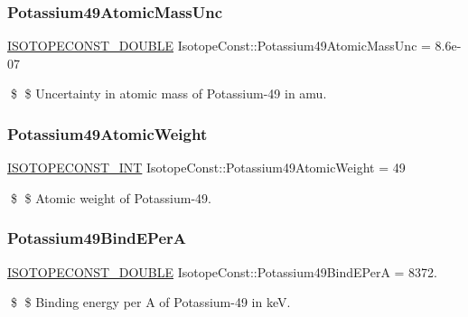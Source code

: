 \subsubsection{\texorpdfstring{Potassium49\+Atomic\+Mass\+Unc}{Potassium49AtomicMassUnc}}
{\footnotesize\ttfamily \mbox{\hyperlink{group___isotope_const-_macros_ga8f45a7272ce02c0b4c65c44636ed719a}{I\+S\+O\+T\+O\+P\+E\+C\+O\+N\+S\+T\+\_\+\+D\+O\+U\+B\+LE}} Isotope\+Const\+::\+Potassium49\+Atomic\+Mass\+Unc = 8.\+6e-\/07}

\$ \$ Uncertainty in atomic mass of Potassium-\/49 in amu. \mbox{\label{group___isotope_const-_potassium-_k49_ga827ba389a0e105abcfdfb1c98f5f6232}} 
\subsubsection{\texorpdfstring{Potassium49\+Atomic\+Weight}{Potassium49AtomicWeight}}
{\footnotesize\ttfamily \mbox{\hyperlink{group___isotope_const-_macros_ga5f18360b3e99483a35c32d789e62621c}{I\+S\+O\+T\+O\+P\+E\+C\+O\+N\+S\+T\+\_\+\+I\+NT}} Isotope\+Const\+::\+Potassium49\+Atomic\+Weight = 49}

\$ \$ Atomic weight of Potassium-\/49. \mbox{\label{group___isotope_const-_potassium-_k49_ga6f46d54396fc95dcbdb14816a830c299}} 
\subsubsection{\texorpdfstring{Potassium49\+Bind\+E\+PerA}{Potassium49BindEPerA}}
{\footnotesize\ttfamily \mbox{\hyperlink{group___isotope_const-_macros_ga8f45a7272ce02c0b4c65c44636ed719a}{I\+S\+O\+T\+O\+P\+E\+C\+O\+N\+S\+T\+\_\+\+D\+O\+U\+B\+LE}} Isotope\+Const\+::\+Potassium49\+Bind\+E\+PerA = 8372.}

\$ \$ Binding energy per A of Potassium-\/49 in keV. \mbox{\label{group___isotope_const-_potassium-_k49_ga1086c8de27e02d2a916a2c655ebd18fc}} 
